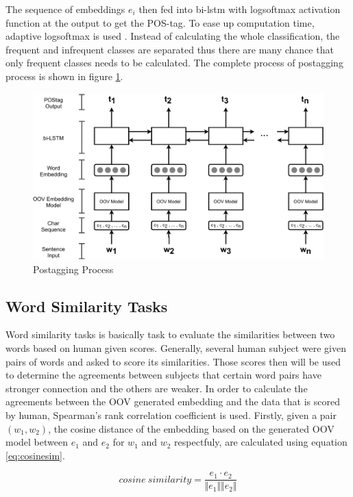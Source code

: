         The sequence of embeddings $e_i$ then fed into bi-lstm with
        logsoftmax activation function at the output to get the
        POS-tag. To ease up computation time, adaptive logsoftmax is
        used \citep{grave2018efficientsoftmax}. Instead of calculating
        the whole classification, the frequent and infrequent classes
        are separated thus there are many chance that only frequent
        classes needs to be calculated. The complete process of
        postagging process is shown in figure \ref{fig:postag}.

        \begin{figure}
            \centering
            \includegraphics[width=.8\linewidth]{images/postag.pdf}
            \caption{Postagging Process}
            \label{fig:postag}
        \end{figure}
 
    \subsection{Word Similarity Tasks}
        Word similarity tasks is basically task to evaluate the
        similarities between two words based on human given scores.
        Generally, several human subject were given pairs of words and
        asked to score its similarities. Those scores then will be
        used to determine the agreements between subjects that certain
        word pairs have stronger connection and the others are weaker.
        In order to calculate the agreements between the OOV generated
        embedding and the data that is scored by human, Spearman's
        rank correlation coefficient is used. Firstly, given a pair
        $(w_1, w_2)$, the cosine distance of the embedding based on
        the generated OOV model between $e_1$ and $e_2$ for $w_1$ and
        $w_2$ respectfuly, are calculated using equation
        \ref{eq:cosinesim}. 

        \begin{equation}
            \label{eq:cosinesim}
            cosine\ similarity = \frac{e_1 \cdot e_2}{\Vert e_1 \Vert \Vert e_2 \Vert}
        \end{equation}

